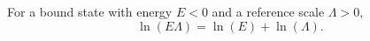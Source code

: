 \documentclass{article}
\begin{document}
For a bound state with energy $E<0$ and a reference scale $\Lambda>0$,
\begin{equation}
\ln(E\Lambda) = \ln(E) + \ln(\Lambda) .
\label{eq:p}
\end{equation}
\end{document}
